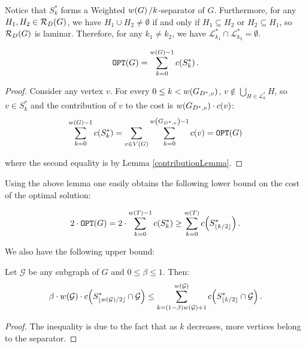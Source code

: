 Notice that $S_{k}^*$ forms a Weighted $w\mathopen{}\left( G \right)/k$-separator of $G$. 
Furthermore, for any $H_1, H_2 \in \mathcal{R}_D\mathopen{}\left( G \right)$, we have 
$H_1 \cup H_2 \neq \emptyset$ if and only if $H_1 \subseteq H_2$ or 
$H_2 \subseteq H_1$, so $\mathcal{R}_D\mathopen{}\left( G \right)$ is laminar. 
Therefore, for any $k_1 \neq k_2$, we have 
$\mathcal{L}_{k_1}^* \cap \mathcal{L}_{k_2}^* = \emptyset$.
\begin{lemma}
                $$\texttt{OPT}\mathopen{}\left( G \right)=\sum_{k=0}^{w\mathopen{}\left( G \right)-1}c\mathopen{}\left( S_{k}^* \right).$$
                
            \begin{proof}
                Consider any vertex $v$. For every $0\leq k<w\mathopen{}\left( G_{D^*,v} \right)$, $v\notin \bigcup_{H\in \mathcal{L}_{k}^*}H$, so $v\in S_{k}^*$ and the contribution of $v$ to the cost is $w\mathopen{}\left( G_{D^*,v} \right)\cdot c\mathopen{}\left( v \right)$:
                $$\sum_{k=0}^{w\mathopen{}\left( G \right)-1}c\mathopen{}\left( S_{k}^* \right)=\sum_{v\in V\mathopen{}\left( G \right)}\sum_{k=0}^{w\mathopen{}\left( G_{D^*,v} \right)-1}c\mathopen{}\left( v \right)=\texttt{OPT}\mathopen{}\left( G \right)$$
                
                where the second equality is by Lemma \ref{contributionLemma}.
            \end{proof}
            \end{lemma}
            
Using the above lemma one easily obtains the following lower bound on the cost of the optimal solution:
\begin{lemma}\label{lb_opt}
            $$
            2\cdot\texttt{OPT}\mathopen{}\left( G \right)= 2\cdot\sum_{k=0}^{w\mathopen{}\left( T \right)-1}c\mathopen{}\left( S_{k}^* \right) \geq \sum_{k=0}^{w\mathopen{}\left( T \right)}c\mathopen{}\left( S_{\mathopen{}\left\lfloor k/2 \right\rfloor}^* \right).
            $$
\end{lemma}

We also have the following upper bound:
\begin{lemma}\label{splitting}
    Let $\mathcal{G}$ be any subgraph of $G$ and $0\leq\beta\leq 1$. Then: 
            $$
           \beta\cdot w\mathopen{}\left( \mathcal{G} \right)\cdot c\mathopen{}\left( S_{\mathopen{}\left\lfloor w\mathopen{}\left( \mathcal{G} \right)/2 \right\rfloor}^*\cap \mathcal{G} \right)
            \leq \sum_{k=\mathopen{}\left( 1-\beta \right)w\mathopen{}\left( \mathcal{G} \right)+1}^{w\mathopen{}\left( \mathcal{G} \right)}c\mathopen{}\left( S_{\mathopen{}\left\lfloor k/2 \right\rfloor}^*\cap \mathcal{G} \right).
            $$
    \begin{proof}
        The inequality is due to the fact that as $k$ decreases, more vertices belong to the separator. 
    \end{proof}
\end{lemma}




